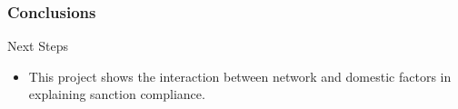 \documentclass{beamer}
\begin{document}
\begin{frame}
\frametitle{Conclusions}

Next Steps
\begin{itemize}
	\item This project shows the interaction between network and domestic factors in explaining sanction compliance.
\end{itemize}
\end{frame}







\end{document}
